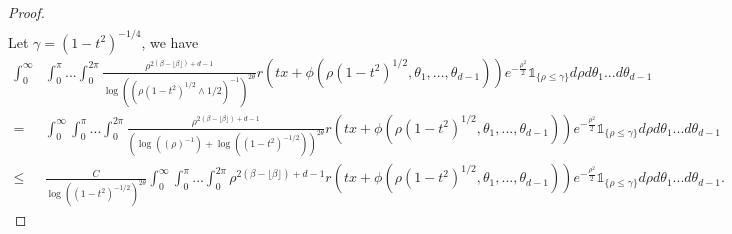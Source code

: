 \documentclass[10pt,a4paper]{amsart}
\begin{document}
\begin{proof}
\begin{align*}
\end{align*}
Let $\gamma=(1-t^2)^{-1/4}$, we have
\begin{align*}
\int_0^{\infty}&\int_0^\pi... \int_0^{2\pi} \frac{\rho^{2(\beta-\lfloor \beta \rfloor) +d-1 }}{\log((\rho(1-t^2)^{1/2}\wedge 1/2)^{-1})^{2\theta}}r(tx +\phi(\rho(1-t^2)^{1/2},\theta_1,...,\theta_{d-1}))e^{-\frac{\rho^2}{2}}\mathds{1}_{\{\rho\leq \gamma\}}d\rho d\theta_1...d\theta_{d-1}\nonumber\\
= & \int_0^{\infty}\int_0^\pi... \int_0^{2\pi} \frac{\rho^{2(\beta-\lfloor \beta \rfloor) +d-1 }}{(\log((\rho)^{-1})+\log((1-t^2)^{-1/2}))^{2\theta}}r(tx +\phi(\rho(1-t^2)^{1/2},\theta_1,...,\theta_{d-1}))e^{-\frac{\rho^2}{2}}\mathds{1}_{\{\rho\leq \gamma\}}d\rho d\theta_1...d\theta_{d-1}\\
\leq & \frac{C}{\log((1-t^2)^{-1/2})^{2\theta}} \int_0^{\infty}\int_0^\pi... \int_0^{2\pi} \rho^{2(\beta-\lfloor \beta \rfloor) +d-1 }r(tx +\phi(\rho(1-t^2)^{1/2},\theta_1,...,\theta_{d-1}))e^{-\frac{\rho^2}{2}}\mathds{1}_{\{\rho\leq \gamma\}}d\rho d\theta_1...d\theta_{d-1}.
\end{align*}


\end{proof}
\end{document}
